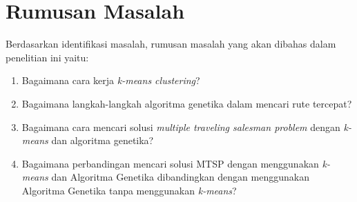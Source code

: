 \section{Rumusan Masalah}

Berdasarkan identifikasi masalah, rumusan masalah yang akan dibahas dalam penelitian ini yaitu:
\begin{enumerate}
    \item Bagaimana cara kerja \textit{k-means clustering}?
    \item Bagaimana langkah-langkah algoritma genetika dalam mencari rute tercepat?
    \item Bagaimana cara mencari solusi \textit{multiple traveling salesman problem} dengan \textit{k-means} dan algoritma genetika?
    \item Bagaimana perbandingan mencari solusi MTSP dengan menggunakan \textit{k-means} dan Algoritma Genetika dibandingkan dengan menggunakan Algoritma Genetika tanpa menggunakan \textit{k-means}?
\end{enumerate}
